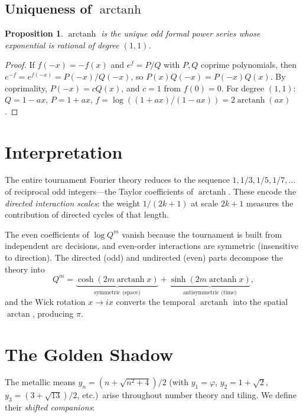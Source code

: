 \documentclass[11pt]{amsart}
\newtheorem{proposition}[theorem]{Proposition}
\theoremstyle{definition}
\DeclareMathOperator{\arctanh}{arctanh}
\DeclareMathOperator{\arctan}{arctan}
\begin{document}
\subsection{Uniqueness of $\arctanh$}

\begin{proposition}\label{prop:unique}
$\arctanh$ is the unique odd formal power series whose exponential is rational of degree $(1,1)$.
\end{proposition}

\begin{proof}
If $f(-x) = -f(x)$ and $e^f = P/Q$ with $P, Q$ coprime polynomials, then $e^{-f} = e^{f(-x)} = P(-x)/Q(-x)$, so $P(x)Q(-x) = P(-x)Q(x)$. By coprimality, $P(-x) = cQ(x)$, and $c = 1$ from $f(0) = 0$. For degree $(1,1)$: $Q = 1 - ax$, $P = 1 + ax$, $f = \log((1{+}ax)/(1{-}ax)) = 2\arctanh(ax)$.
\end{proof}

\section{Interpretation}

The entire tournament Fourier theory reduces to the sequence $1, 1/3, 1/5, 1/7, \ldots$ of reciprocal odd integers---the Taylor coefficients of $\arctanh$. These encode the \emph{directed interaction scales}: the weight $1/(2k{+}1)$ at scale $2k{+}1$ measures the contribution of directed cycles of that length.

The even coefficients of $\log Q^m$ vanish because the tournament is built from independent arc decisions, and even-order interactions are symmetric (insensitive to direction). The directed (odd) and undirected (even) parts decompose the theory into
\[
Q^m = \underbrace{\cosh(2m\arctanh x)}_{\text{symmetric (space)}} + \underbrace{\sinh(2m\arctanh x)}_{\text{antisymmetric (time)}},
\]
and the Wick rotation $x \to ix$ converts the temporal $\arctanh$ into the spatial $\arctan$, producing $\pi$.

\section{The Golden Shadow}

The metallic means $y_n = (n + \sqrt{n^2+4})/2$ (with $y_1 = \varphi$, $y_2 = 1+\sqrt{2}$, $y_3 = (3+\sqrt{13})/2$, etc.)\ arise throughout number theory and tiling. We define their \emph{shifted companions}:
\end{document}
